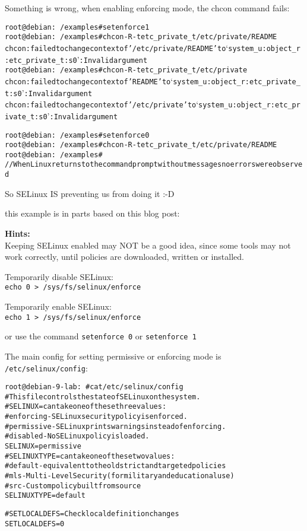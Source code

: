 \documentclass[a4paper,11pt,notitlepage]{report}
\begin{document}
Something is wrong, when enabling enforcing mode, the chcon command fails:
\begin{alltt}
root@debian:~/examples# setenforce 1
root@debian:~/examples# chcon -R -t etc_private_t /etc/private/README
chcon: failed to change context of '/etc/private/README' to ‘system_u:object_r:etc_private_t:s0’: Invalid argument
root@debian:~/examples# chcon -R -t etc_private_t /etc/private
chcon: failed to change context of 'README' to ‘system_u:object_r:etc_private_t:s0’: Invalid argument
chcon: failed to change context of '/etc/private' to ‘system_u:object_r:etc_private_t:s0’: Invalid argument

root@debian:~/examples# setenforce 0
root@debian:~/examples# chcon -R -t etc_private_t /etc/private/README
root@debian:~/examples#
// When Linux returns to the command prompt without messages no errors were observed
\end{alltt}

So SELinux IS preventing us from doing it :-D

this example is in parts based on this blog post:\\


{\bf Hints:}\\
Keeping SELinux enabled may NOT be a good idea, since some tools may not work correctly, until policies are downloaded, written or installed.

Temporarily disable SELinux:\\
\verb+echo 0 > /sys/fs/selinux/enforce+

Temporarily enable SELinux:\\
\verb+echo 1 > /sys/fs/selinux/enforce+

or use the command \verb+setenforce 0+ or
\verb+setenforce 1+

The main config for setting permissive or enforcing mode is
\verb+/etc/selinux/config+:
\begin{alltt}
root@debian-9-lab:~# cat /etc/selinux/config
# This file controls the state of SELinux on the system.
# SELINUX= can take one of these three values:
# enforcing - SELinux security policy is enforced.
# permissive - SELinux prints warnings instead of enforcing.
# disabled - No SELinux policy is loaded.
SELINUX=permissive
# SELINUXTYPE= can take one of these two values:
# default - equivalent to the old strict and targeted policies
# mls     - Multi-Level Security (for military and educational use)
# src     - Custom policy built from source
SELINUXTYPE=default

# SETLOCALDEFS= Check local definition changes
SETLOCALDEFS=0
\end{alltt}
\end{document}

